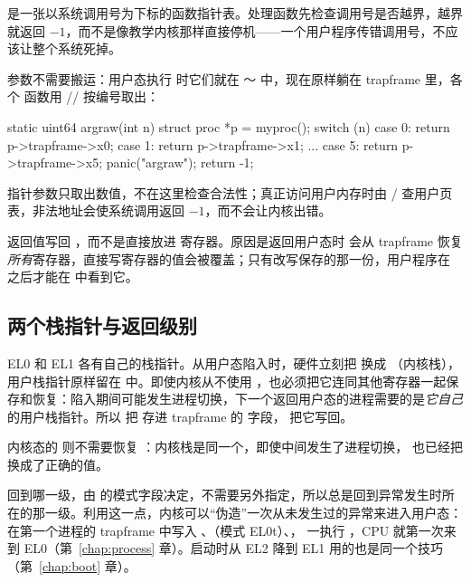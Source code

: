  是一张以系统调用号为下标的函数指针表。处理函数先检查调用号是否越界，越界就返回 $-1$，而不是像教学内核那样直接停机——一个用户程序传错调用号，不应该让整个系统死掉。

参数不需要搬运：用户态执行  时它们就在 ～ 中，现在原样躺在 trapframe 里，各个  函数用 // 按编号取出：

\begin{ccode}
static uint64 argraw(int n)
{
  struct proc *p = myproc();
  switch (n) {
  case 0: return p->trapframe->x0;
  case 1: return p->trapframe->x1;
  ...
  case 5: return p->trapframe->x5;
  }
  panic("argraw");
  return -1;
}
\end{ccode}

指针参数只取出数值，不在这里检查合法性；真正访问用户内存时由 / 查用户页表，非法地址会使系统调用返回 $-1$，而不会让内核出错。

返回值写回 ，而不是直接放进  寄存器。原因是返回用户态时  会从 trapframe 恢复\emph{所有}寄存器，直接写寄存器的值会被覆盖；只有改写保存的那一份，用户程序在  之后才能在  中看到它。

\subsection{两个栈指针与返回级别}

EL0 和 EL1 各有自己的栈指针。从用户态陷入时，硬件立刻把  换成 （内核栈），用户栈指针原样留在  中。即使内核从不使用 ，也必须把它连同其他寄存器一起保存和恢复：陷入期间可能发生进程切换，下一个返回用户态的进程需要的是\emph{它自己}的用户栈指针。所以  把  存进 trapframe 的  字段， 把它写回。

内核态的  则不需要恢复 ：内核栈是同一个，即使中间发生了进程切换， 也已经把  换成了正确的值。

 回到哪一级，由  的模式字段决定，不需要另外指定，所以总是回到异常发生时所在的那一级。利用这一点，内核可以“伪造”一次从未发生过的异常来进入用户态： 在第一个进程的 trapframe 中写入 、（模式 EL0t）、， 一执行 ，CPU 就第一次来到 EL0（第~\ref{chap:process} 章）。启动时从 EL2 降到 EL1 用的也是同一个技巧（第~\ref{chap:boot} 章）。

